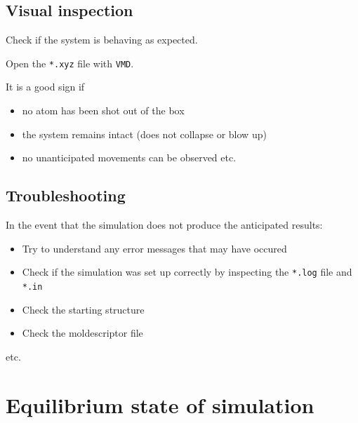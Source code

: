\documentclass[
  letterpaper,
  DIV=11,
  numbers=noendperiod]{scrreprt}
\begin{document}
\hypertarget{visual-inspection}{%
\section{Visual inspection}\label{visual-inspection}}

Check if the system is behaving as expected.

Open the \texttt{*.xyz} file with \texttt{VMD}.

It is a good sign if

\begin{itemize}
\item[$\square$]
  no atom has been shot out of the box
\item[$\square$]
  the system remains intact (does not collapse or blow up)
\item[$\square$]
  no unanticipated movements can be observed etc.
\end{itemize}

\hypertarget{troubleshooting}{%
\section*{Troubleshooting}\label{troubleshooting}}


In the event that the simulation does not produce the anticipated
results:

\begin{itemize}
\item[$\square$]
  Try to understand any error messages that may have occured
\item[$\square$]
  Check if the simulation was set up correctly by inspecting the
  \texttt{*.log} file and \texttt{*.in}
\item[$\square$]
  Check the starting structure
\item[$\square$]
  Check the moldescriptor file
\end{itemize}

etc.

\hypertarget{equilibrium-state-of-simulation}{%
\chapter*{Equilibrium state of
simulation}\label{equilibrium-state-of-simulation}}

\end{document}

